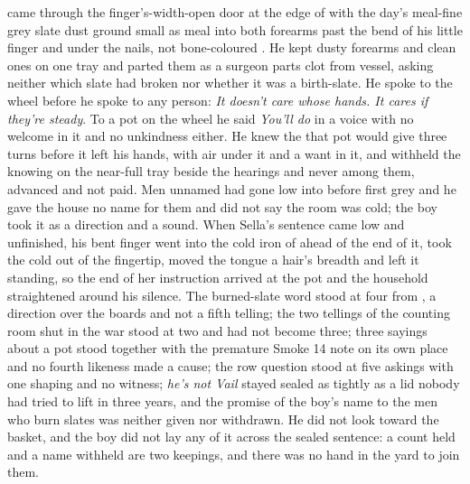 \scenebreak

 came through the finger's-width-open door at the edge of  with the day's meal-fine grey slate dust ground small as meal into both forearms past the bend of his little finger and under the nails, not bone-coloured . He kept dusty forearms and clean ones on one tray and parted them as a surgeon parts clot from vessel, asking neither which slate had broken nor whether it was a birth-slate. He spoke to the wheel before he spoke to any person: \emph{It doesn't care whose hands. It cares if they're steady}. To a pot on the wheel he said \emph{You'll do} in a voice with no welcome in it and no unkindness either. He knew the  that pot would give three turns before it left his hands, with air under it and a want in it, and withheld the knowing on the near-full tray beside the hearings and never among them, advanced and not paid. Men unnamed had gone low into  before first grey and he gave the house no name for them and did not say the room was cold; the boy took it as a direction and a sound. When Sella's sentence came low and unfinished, his bent finger went into the cold iron of  ahead of the end of it, took the cold out of the fingertip, moved the tongue a hair's breadth and left it standing, so the end of her instruction arrived at the pot and the household straightened around his silence. The burned-slate word stood at four from , a direction over the boards and not a fifth telling; the two tellings of the counting room shut in the war stood at two and had not become three; three sayings about a pot stood together with the premature Smoke 14 note on its own place and no fourth likeness made a cause; the row question stood at five askings with one shaping and no witness; \emph{he's not Vail} stayed sealed as tightly as a lid nobody had tried to lift in three years, and the promise of the boy's name to the men who burn slates was neither given nor withdrawn. He did not look toward the basket, and the boy did not lay any of it across the sealed sentence: a count held and a name withheld are two keepings, and there was no hand in the yard to join them.


